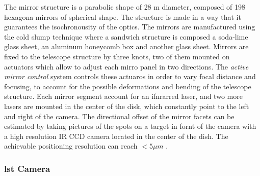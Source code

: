 \documentclass[main.tex]{subfiles}
\begin{document}
  The mirror structure is a parabolic shape of 28 m diameter, composed of 198 hexagona mirrors of spherical shape. The structure is made in a way that it guarantees the isochronousity of the optics. The mirrors are manufactured using the cold slump technique where a sandwich structure is composed a soda-lime glass sheet, an aluminum honeycomb box and another glass sheet\cite{2017LST}.
Mirrors are fixed to the telescope structure by three knots, two of them mounted on actuators which allow to adjust each mirro panel in two directions. The \textit{active mirror control} system controls these actuaros in order to vary focal distance and focusing, to account for the possible deformations and bending of the telescope structure. Each mirror segment account for an ifnrarred laser, and two more lasers are mounted in the center of the disk, which constantly point to the left and right of the camera. The directional offset of the mirror facets can be estimated by taking pictures of the spots on a target in fornt of the camera with a high resolution IR CCD camera located in the center of the dish. The achievable positioning resolution can reach $< 5 \mu m$ \cite{2013LST}.
  
  \subsubsection{\gls{lst} Camera}
\end{document}
